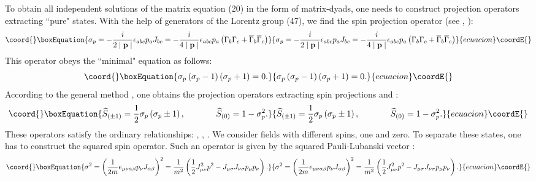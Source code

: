 \documentclass[a4paper,12pt]{article}
\begin{document}
To obtain all independent solutions of the matrix equation (20) in
the form of matrix-dyads, one needs to construct projection
operators \cite{Fedorov} extracting ``pure" states. With the help
of generators of the Lorentz group (47), we find the spin
projection operator (see \cite{Kruglov1}, \cite{monogr}):
\begin{equation}\coord{}\boxEquation{
\sigma _p=-\frac i{2\mid \mathbf{p}\mid }\epsilon
_{abc}p_aJ_{bc}=-\frac i{4\mid \mathbf{p}\mid }\epsilon
_{abc}p_a\left( \Gamma _b\Gamma _c+ \overline{\Gamma
}_b\overline{\Gamma }_c\right)  \label{68}
}{
\sigma _p=-\frac i{2\mid \mathbf{p}\mid }\epsilon
_{abc}p_aJ_{bc}=-\frac i{4\mid \mathbf{p}\mid }\epsilon
_{abc}p_a\left( \Gamma _b\Gamma _c+ \overline{\Gamma
}_b\overline{\Gamma }_c\right)  }{ecuacion}\coordE{}\end{equation}
This operator obeys the ``minimal" equation as follows:
\begin{equation}\coord{}\boxEquation{
\sigma _p\left( \sigma _p-1\right) \left( \sigma _p+1\right) =0 .
\label{69}
}{
\sigma _p\left( \sigma _p-1\right) \left( \sigma _p+1\right) =0 .
}{ecuacion}\coordE{}\end{equation}
According to the general method \cite{Fedorov}, one obtains the
projection operators extracting spin projections \coordHE{} and \coordHE{}:
\begin{equation}\coord{}\boxEquation{
\widehat{S}_{(\pm 1)}=\frac 12\sigma _p\left( \sigma _p\pm
1\right) ,\hspace{0.5in}\widehat{S}_{(0)}=1-\sigma _p^2
.\label{70}
}{
\widehat{S}_{(\pm 1)}=\frac 12\sigma _p\left( \sigma _p\pm
1\right) ,\hspace{0.5in}\widehat{S}_{(0)}=1-\sigma _p^2
.}{ecuacion}\coordE{}\end{equation}
These operators satisfy the ordinary relationships:
\coordHE{}, \coordHE{},
\coordHE{}. We consider fields with
different spins, one and zero. To separate these states, one has
to construct the squared spin operator. Such an operator is given
by the squared Pauli-Lubanski vector \coordHE{}:
\begin{equation}\coord{}\boxEquation{
\sigma ^2=\left( \frac 1{2m}e_{\mu \nu \alpha \beta }p_\nu
J_{\alpha \beta }\right) ^2=\frac 1{m^2}\left( \frac{1}{2}J_{\mu
\nu }^2p^2-J_{\mu \sigma }J_{\nu \sigma }p_\mu p_\nu \right) .
\label{71}
}{
\sigma ^2=\left( \frac 1{2m}e_{\mu \nu \alpha \beta }p_\nu
J_{\alpha \beta }\right) ^2=\frac 1{m^2}\left( \frac{1}{2}J_{\mu
\nu }^2p^2-J_{\mu \sigma }J_{\nu \sigma }p_\mu p_\nu \right) .
}{ecuacion}\coordE{}\end{equation}
\end{document}

